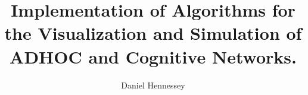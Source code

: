 \documentclass[12pt, letterpaper]{drexelthesis}
\author{Daniel Hennessey}
\title{Implementation of Algorithms for the Visualization and Simulation of ADHOC and Cognitive Networks.}
\begin{document}
 

	\doublespacing
	\maketitle 

\begin{preliminary}
	\sloppy
	\copyrightpage
%	
	
	\mytableofcontents
	\mylistoftables
	\mylistoffigures
	
\end{preliminary}

\begin{thesis}
	\fussy

	\singlespacing
%	
	
	
\end{thesis}
\end{document}
